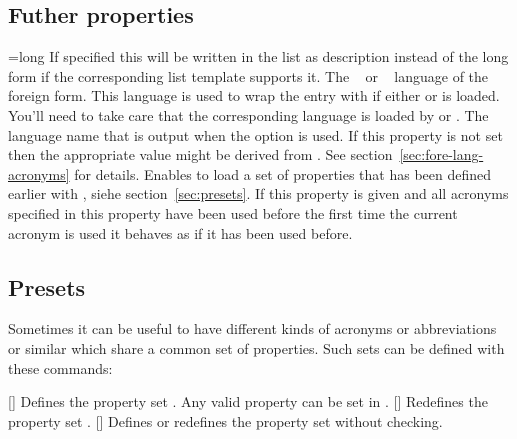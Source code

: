 \documentclass{acro-manual}
\begin{document}
\subsection{Futher properties}\label{sec:futher-properties}
\begin{properties}
  \Default={long}
    If specified this will be written in the list as description instead of
    the long form if the corresponding list template supports it.
  \Default
    The ~\cite{pkg:babel} or
    ~\cite{pkg:polyglossia} language of the foreign form.
    This language is used to wrap the entry with
     if either  or
     is loaded.  You'll need to take care that the
    corresponding language is loaded by  or .
  \Default
    The language name that is output when the option
    \code{/} is used.  If this property is not
    set then the appropriate value might be derived from
    . See section~\vref{sec:fore-lang-acronyms} for
    details.
  \Default
    Enables to load a set of properties that has been
    defined earlier with , siehe
    section~\vref{sec:presets}.
  \Default
    If this property is given and all acronyms specified in
    this property have been used before the first time the current acronym is
    used it behaves as if it has been used before.
\end{properties}

\subsection{Presets}\label{sec:presets}
Sometimes it can be useful to have different kinds of
acronyms or abbreviations or similar which share a common set of properties.
Such sets can be defined with these commands:
\begin{commands}
  []
    Defines the property set .  Any valid property can be set
    in .
  []
    Redefines the property set .
  []
    Defines or redefines the property set  without checking.
\end{commands}
\end{document}
